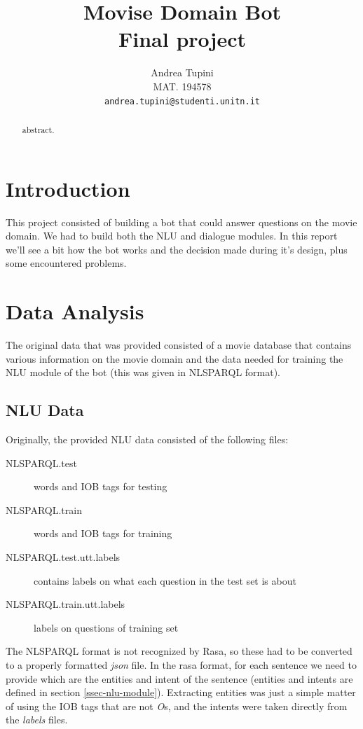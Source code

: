 \documentclass[11pt,a4paper]{article}
\title{Movise Domain Bot \\ Final project}
\author{Andrea Tupini \\
  MAT.  194578 \\
  {\tt andrea.tupini@studenti.unitn.it}}
\date{}
\begin{document}
	
\maketitle

\begin{abstract}
	
	abstract. 
	\\
	
\end{abstract} 

\section{Introduction}

	This project consisted of building a bot that could answer questions on the movie domain. We had to build both the NLU and dialogue modules. In this report we'll see a bit how the bot works and the decision made during it's design, plus some encountered problems.
	
\section{Data Analysis}
\label{sec-data-analysis}
	
	The original data that was provided consisted of a movie database that contains various information on the movie domain and the data needed for training the NLU module of the bot (this was given in NLSPARQL format).
	
	\subsection{NLU Data}
	\label{ssec-nlu-data}
	
		Originally, the provided NLU data consisted of the following files: 
		
		\begin{description}
			\item[NLSPARQL.test] words and IOB tags for testing
			\item[NLSPARQL.train] words and IOB tags for training
			\item[NLSPARQL.test.utt.labels] contains labels on what each question in the test set is about              
			\item[NLSPARQL.train.utt.labels] labels on questions of training set
		\end{description}
	
		The NLSPARQL format is not recognized by Rasa, so these had to be converted to a properly formatted \textit{json} file. In the rasa format, for each sentence we need to provide which are the entities and intent of the sentence (entities and intents are defined in section \ref{ssec-nlu-module}). Extracting entities was just a simple matter of using the IOB tags that are not \textit{O}s, and the intents were taken directly from the \textit{labels} files.
		
\end{document}
